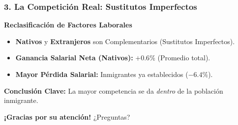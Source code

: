\documentclass{beamer}
\begin{document}

\begin{frame}
\frametitle{3. La Competición Real: Sustitutos Imperfectos}

\begin{block}{\textbf{Reclasificación de Factores Laborales}}
\begin{itemize}
    \item \textbf{Nativos} y \textbf{Extranjeros} son \alert{Complementarios} (Sustitutos Imperfectos).
    \item \textbf{Ganancia Salarial Neta (Nativos):} $\mathbf{+0.6\%}$ (Promedio total).
    \item \textbf{Mayor Pérdida Salarial:} Inmigrantes ya establecidos ($\mathbf{-6.4\%}$).
\end{itemize}
\end{block}

\vfill

\textbf{Conclusión Clave:} La mayor competencia se da \textit{dentro} de la población inmigrante.

\end{frame}


\begin{frame}
\centering
\Huge \textbf{¡Gracias por su atención!}
\vfill
\Large ¿Preguntas?
\end{frame}
\end{document}
